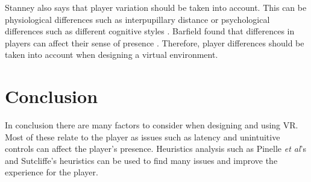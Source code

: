 \documentclass{scrartcl}
\begin{document}
Stanney also says that player variation should be taken into account. This can be physiological differences such as interpupillary distance or psychological differences such as different cognitive styles \cite{stanney}. Barfield found that differences in players can affect their sense of presence \cite{barfield1993sense}. Therefore, player differences should be taken into account when designing a virtual environment.

\section{Conclusion}
In conclusion there are many factors to consider when designing and using VR. Most of these relate to the player as issues such as latency and unintuitive controls can affect the player's presence.   Heuristics analysis such as Pinelle \textit{et al}'s and Sutcliffe's heuristics can be used to find many issues and improve the experience for the player.
	


	
\end{document}
